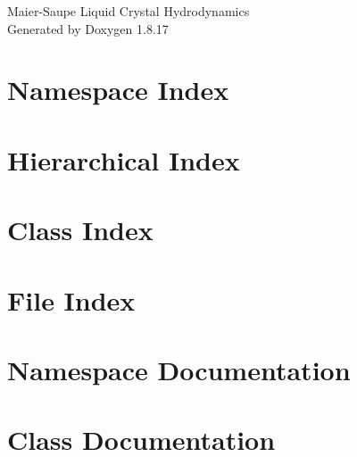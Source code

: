 \let\mypdfximage\pdfximage\def\pdfximage{\immediate\mypdfximage}\documentclass[twoside]{book}
\newcommand{\+}{\discretionary{\mbox{\scriptsize$\hookleftarrow$}}{}{}}
\newcommand{\clearemptydoublepage}{%
  \newpage{\pagestyle{empty}\cleardoublepage}%
}
\begin{document}
\hypersetup{pageanchor=false,
             bookmarksnumbered=true,
             pdfencoding=unicode
            }
\begin{titlepage}
\vspace*{7cm}
\begin{center}%
{\Large Maier-\/\+Saupe Liquid Crystal Hydrodynamics }\\
\vspace*{1cm}
{\large Generated by Doxygen 1.8.17}\\
\end{center}
\end{titlepage}
\clearemptydoublepage
{}
\tableofcontents
\clearemptydoublepage
{}
\hypersetup{pageanchor=true}

\chapter{Namespace Index}

\chapter{Hierarchical Index}

\chapter{Class Index}

\chapter{File Index}

\chapter{Namespace Documentation}





\chapter{Class Documentation}

































\end{document}
